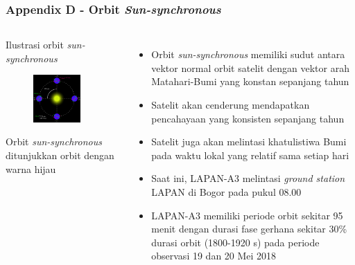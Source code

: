 \documentclass[8pt]{beamer}
\begin{document}
\begin{frame}
  \frametitle{Appendix D - Orbit \textit{Sun-synchronous}}
  \begin{columns}[T]
    \begin{block}{Ilustrasi orbit \textit{sun-synchronous}}
      \begin{figure}
          \includegraphics[width=0.8\textwidth]{figure/sso.png}
      \end{figure}
      Orbit \textit{sun-synchronous} ditunjukkan orbit dengan warna hijau
    \end{block}
    \begin{itemize}
      \item Orbit \textit{sun-synchronous} memiliki sudut antara vektor normal orbit satelit dengan vektor arah Matahari-Bumi yang konstan sepanjang tahun
      \item Satelit akan cenderung mendapatkan pencahayaan yang konsisten sepanjang tahun
      \item Satelit juga akan melintasi khatulistiwa Bumi pada waktu lokal yang relatif sama setiap hari
      \item Saat ini, LAPAN-A3 melintasi \textit{ground station} LAPAN di Bogor pada pukul 08.00
      \item LAPAN-A3 memiliki periode orbit sekitar 95 menit dengan durasi fase gerhana sekitar 30\% durasi orbit (1800-1920 s) pada periode observasi 19 dan 20 Mei 2018
    \end{itemize}
  \end{columns}
\end{frame}
\end{document}

